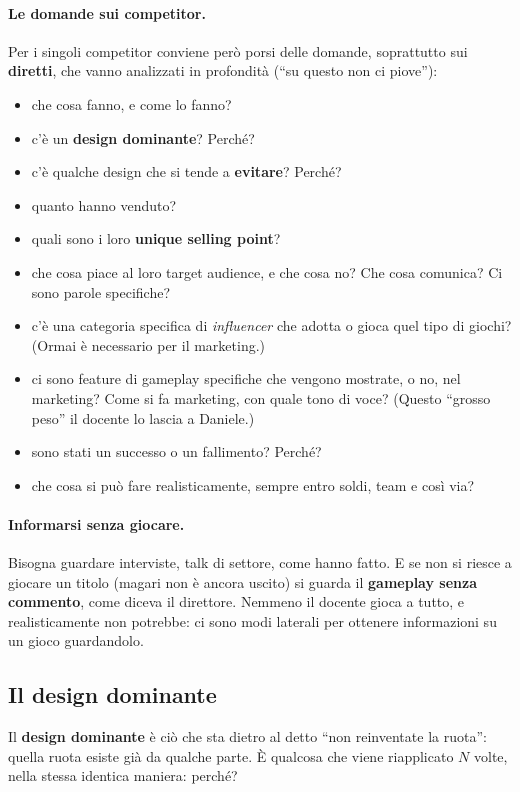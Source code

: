 \paragraph{Le domande sui competitor.} Per i singoli competitor conviene però
porsi delle domande, soprattutto sui \textbf{diretti}, che vanno analizzati
in profondità (``su questo non ci piove''):
\begin{itemize}
  \item che cosa fanno, e come lo fanno?
  \item c'è un \textbf{design dominante}? Perché?
  \item c'è qualche design che si tende a \textbf{evitare}? Perché?
  \item quanto hanno venduto?
  \item quali sono i loro \textbf{unique selling point}?
  \item che cosa piace al loro target audience, e che cosa no? Che cosa
        comunica? Ci sono parole specifiche?
  \item c'è una categoria specifica di \emph{influencer} che adotta o gioca
        quel tipo di giochi? (Ormai è necessario per il marketing.)
  \item ci sono feature di gameplay specifiche che vengono mostrate, o no, nel
        marketing? Come si fa marketing, con quale tono di voce? (Questo
        ``grosso peso'' il docente lo lascia a Daniele.)
  \item sono stati un successo o un fallimento? Perché?
  \item che cosa si può fare realisticamente, sempre entro soldi, team e
        così via?
\end{itemize}

\paragraph{Informarsi senza giocare.} Bisogna guardare interviste, talk di
settore, come hanno fatto. E se non si riesce a giocare un titolo (magari non
è ancora uscito) si guarda il \textbf{gameplay senza commento}, come diceva
il direttore. Nemmeno il docente gioca a tutto, e realisticamente non
potrebbe: ci sono modi laterali per ottenere informazioni su un gioco
guardandolo.

\subsection{Il design dominante}

Il \textbf{design dominante} è ciò che sta dietro al detto ``non reinventate
la ruota'': quella ruota esiste già da qualche parte. È qualcosa che viene
riapplicato $N$ volte, nella stessa identica maniera: perché?


